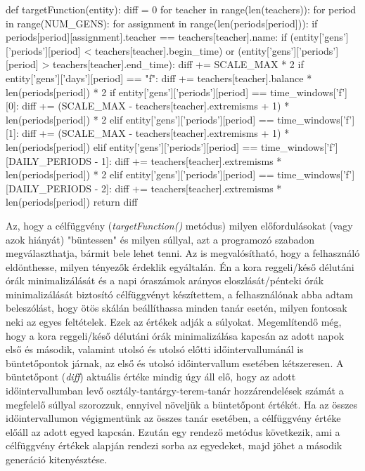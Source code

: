 \documentclass[a4paper,12pt]{article}
\begin{document}
\begin{python}
def targetFunction(entity):
    diff = 0
    for teacher in range(len(teachers)):
        for period in range(NUM_GENS):
            for assignment in range(len(periods[period])):
                if periods[period][assignment].teacher == teachers[teacher].name:
                    if (entity['gens']['periods'][period] < teachers[teacher].begin_time) or (entity['gens']['periods'][period] > teachers[teacher].end_time):
                        diff += SCALE_MAX * 2
                    if entity['gens']['days'][period] == "f":
                        diff += teachers[teacher].balance * len(periods[period]) * 2
                    if entity['gens']['periods'][period] == time_windows['f'][0]:
                        diff += (SCALE_MAX - teachers[teacher].extremisms + 1) * len(periods[period]) * 2
                    elif entity['gens']['periods'][period] == time_windows['f'][1]:
                        diff += (SCALE_MAX - teachers[teacher].extremisms + 1) * len(periods[period])
                    elif entity['gens']['periods'][period] == time_windows['f'][DAILY_PERIODS - 1]:
                        diff += teachers[teacher].extremisms * len(periods[period]) * 2
                    elif entity['gens']['periods'][period] == time_windows['f'][DAILY_PERIODS - 2]:
                        diff += teachers[teacher].extremisms * len(periods[period])
    return diff
\end{python}

Az, hogy a célfüggvény (\textsl{targetFunction()} metódus) milyen előfordulásokat (vagy azok hiányát) "büntessen" és milyen súllyal, azt a programozó szabadon megválaszthatja, bármit bele lehet tenni. Az is megvalósítható, hogy a felhasználó eldönthesse, milyen tényezők érdeklik egyáltalán. Én a kora reggeli/késő délutáni órák minimalizálását és a napi óraszámok arányos eloszlását/pénteki órák minimalizálását biztosító célfüggvényt készítettem, a felhasználónak abba adtam beleszólást, hogy ötös skálán beállíthassa minden tanár esetén, milyen fontosak neki az egyes feltételek. Ezek az értékek adják a súlyokat. Megemlítendő még, hogy a kora reggeli/késő délutáni órák minimalizálása kapcsán az adott napok első és második, valamint utolsó és utolsó előtti időintervallumánál is büntetőpontok járnak, az első és utolsó időintervallum esetében kétszeresen. A büntetőpont (\textsl{diff}) aktuális értéke mindig úgy áll elő, hogy az adott időintervallumban levő osztály-tantárgy-terem-tanár hozzárendelések számát a megfelelő súllyal szorozzuk, ennyivel növeljük a büntetőpont értékét. Ha az összes időintervallumon végigmentünk az összes tanár esetében, a célfüggvény értéke előáll az adott egyed kapcsán. Ezután egy rendező metódus következik, ami a célfüggvény értékek alapján rendezi sorba az egyedeket, majd jöhet a második generáció kitenyésztése.
\end{document}
